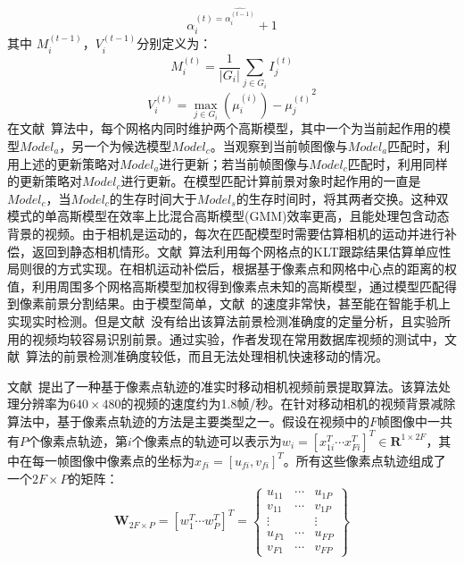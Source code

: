 $$ \alpha_i^{(t) = \hat{\alpha_i^{(t-1)}}}+1$$
其中 $M_i^{(t-1)}$，$V_i^{(t-1)}$分别定义为：
$$ M_i^{(t)} = \frac{1}{|G_i|}\sum_{j\in G_i}I_j^{(t)}$$
$$ V_i^{(t)} = \max_{j \in G_i}{(\mu_i^{(i)})-\mu_j^{(t)}}^2 $$
在文献~算法中，每个网格内同时维护两个高斯模型，其中一个为当前起作用的模型$Model_a$，另一个为候选模型$Model_c$。当观察到当前帧图像与$Model_a$匹配时，利用上述的更新策略对$Model_a$进行更新；若当前帧图像与$Model_c$匹配时，利用同样的更新策略对$Model_c$进行更新。在模型匹配计算前景对象时起作用的一直是$Model_c$，当$Model_c$的生存时间大于$Model_s$的生存时间时，将其两者交换。这种双模式的单高斯模型在效率上比混合高斯模型(GMM)效率更高，且能处理包含动态背景的视频。由于相机是运动的，每次在匹配模型时需要估算相机的运动并进行补偿，返回到静态相机情形。文献~算法利用每个网格点的KLT跟踪结果估算单应性局则很的方式实现。在相机运动补偿后，根据基于像素点和网格中心点的距离的权值，利用周围多个网格高斯模型加权得到像素点未知的高斯模型，通过模型匹配得到像素前景分割结果。由于模型简单，文献~的速度非常快，甚至能在智能手机上实现实时检测。但是文献~没有给出该算法前景检测准确度的定量分析，且实验所用的视频均较容易识别前景。通过实验，作者发现在常用数据库视频的测试中，文献~算法的前景检测准确度较低，而且无法处理相机快速移动的情况。\par

文献~\cite{ACPRRealTime}提出了一种基于像素点轨迹的准实时移动相机视频前景提取算法。该算法处理分辨率为$640 \times 480$的视频的速度约为1.8帧/秒。在针对移动相机的视频背景减除算法中，基于像素点轨迹的方法是主要类型之一。假设在视频中的$F$帧图像中一共有$P$个像素点轨迹，第$i$个像素点的轨迹可以表示为$w_i={[x_{1i}^T \cdots x_{Fi}^{T}]}^T \in \mathbf{R}^{1 \times 2F}$，其中在每一帧图像中像素点的坐标为$ x_{fi} = {[u_{fi},v_{fi}]}^T$。所有这些像素点轨迹组成了一个$2F \times P$的矩阵：
\begin{equation}
\label{ch5:equ:trajmatrix}
\mathbf{W}_{2F \times P} = {[w_{1}^T \cdots w_{P}^T]}^T = \begin{Bmatrix}
u_{11} & \cdots & u_{1P} \\
v_{11} & \cdots  &  v_{1P}\\
 \vdots &  & \vdots \\
 u_{F1}& \cdots & u_{FP}\\
 v_{F1}& \cdots & v_{FP}
\end{Bmatrix}
\end{equation} \par

